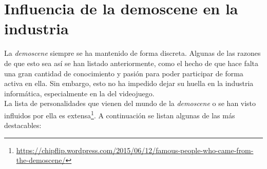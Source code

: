 
\section{Influencia de la demoscene en la industria}

La \emph{demoscene} siempre se ha mantenido de forma discreta. Algunas de las razones de que esto sea así se han listado anteriormente, como el hecho de que hace falta una gran cantidad de conocimiento y pasión para poder participar de forma activa en ella. Sin embargo, esto no ha impedido dejar su huella en la industria informática, especialmente en la del videojuego.\\

La lista de personalidades que vienen del mundo de la \emph{demoscene} o se han visto influidos por ella es extensa\footnote{\url{https://chipflip.wordpress.com/2015/06/12/famous-people-who-came-from-the-demoscene/}}. A continuación se listan algunas de las más destacables:

